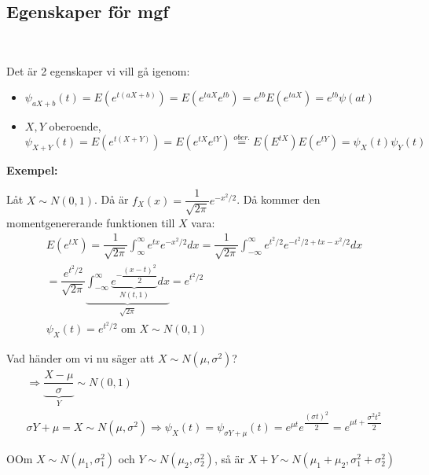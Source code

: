 \subsection{Egenskaper för mgf}\hfill\\\par
\noindent Det är 2 egenskaper vi vill gå igenom:
\par\bigskip
\begin{itemize}
  \item $\psi_{aX+b}(t) = E(e^{t(aX+b)}) = E(e^{taX}e^{tb}) = e^{tb}E(e^{taX}) = e^{tb}\psi(at)$
  \item $X,Y$ oberoende, $\psi_{X+Y}(t) = E(e^{t(X+Y)}) = E(e^{tX}e^{tY})\stackrel{ober.}{=}E(E^{tX})E(e^{tY}) = \psi_X(t)\psi_Y(t)$
\end{itemize}
\par\bigskip
\noindent\textbf{Exempel:}\par
\noindent Låt $X\sim N(0,1)$. Då är $f_X(x) = \dfrac{1}{\sqrt{2\pi}}e^{-x^2/2}$. Då kommer den momentgenererande funktionen till $X$ vara:
\begin{equation*}
  \begin{gathered}
    E(e^{tX}) = \dfrac{1}{\sqrt{2\pi}}\int_{\infty}^{\infty}e^{tx}e^{-x^2/2}dx = \dfrac{1}{\sqrt{2\pi}}\int_{-\infty}^{\infty}e^{t^2/2}e^{-t^2/2+tx-x^2/2}dx\\
    = \dfrac{e^{t^2/2}}{\sqrt{2\pi}}\underbrace{\int_{-\infty}^{\infty}\underbrace{e^{-\dfrac{(x-t)^2}{2}}}_{\text{$N(t,1)$}}dx}_{\text{$\sqrt{2\pi}$}} = e^{t^2/2}\\
    \psi_X(t) = e^{t^2/2}\text{ om } X\sim N(0,1)
  \end{gathered}
\end{equation*}
\par\bigskip
\noindent Vad händer om vi nu säger att $X\sim N(\mu,\sigma^2)$?
\begin{equation*}
  \begin{gathered}
    \Rightarrow \underbrace{\dfrac{X-\mu}{\sigma}}_{\text{$Y$}}\sim N(0,1)\\
    \sigma Y+\mu = X\sim N(\mu,\sigma^2)\Rightarrow \psi_X(t) = \psi_{\sigma Y+\mu}(t) = e^{\mu t}e^{\dfrac{(\sigma t)^2}{2}} = e^{\mu t+\dfrac{\sigma^2t^2}{2}}
  \end{gathered}
\end{equation*}
\newpage
\begin{theo}
  OOm $X\sim N(\mu_1, \sigma_1^2)$ och $Y\sim N(\mu_2,\sigma_2^2)$, så är $X+Y\sim N(\mu_1+\mu_2,\sigma_1^2+\sigma_2^2)$
\end{theo}

